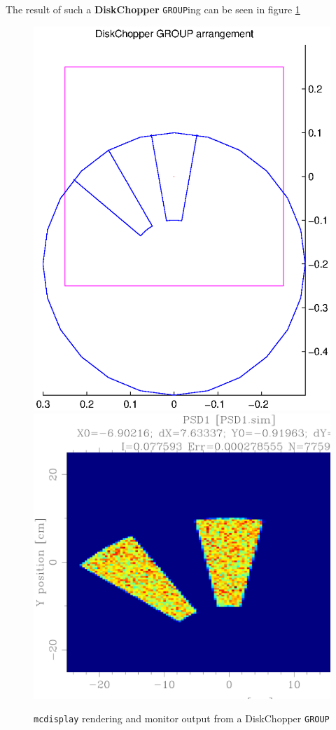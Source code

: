 The result of such a {\bf DiskChopper} \texttt{GROUP}ing can be seen in
figure \ref{f:chopper2}

\begin{figure}[ht]
\includegraphics[width=0.4\linewidth]{figures/DiskChopperGroup.ps}
\includegraphics[width=0.4\linewidth]{figures/DiskChopperPSD.eps}
\caption{\texttt{mcdisplay} rendering and monitor output from a DiskChopper \texttt{GROUP}} 
\label{f:chopper2}
\end{figure}
